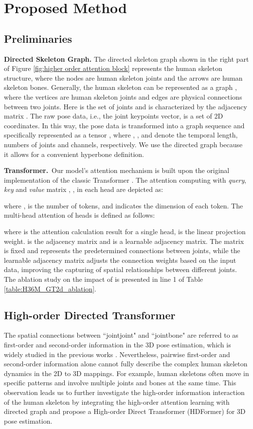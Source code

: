 \documentclass{article}
\begin{document}
\section{Proposed Method}
\subsection{Preliminaries}
\noindent \textbf{Directed Skeleton Graph.} The directed skeleton graph  shown in the right part of Figure \ref{fig:higher order attention block} represents the human skeleton structure, where the nodes are human skeleton joints and the arrows are human skeleton bones. Generally, the human skeleton can be represented as a graph , where the vertices are human skeleton joints and edges are physical connections between two joints. Here  is the set of  joints and  is characterized by the adjacency matrix . 
The raw pose data, i.e., the joint keypoints vector, is a set of 2D coordinates. In this way, the pose data is transformed into a graph sequence and specifically represented as a tensor , where , , and  denote the temporal length, numbers of joints and channels, respectively. We use the directed graph because it allows for a convenient hyperbone definition.


\noindent \textbf{Transformer.}~Our model's attention mechanism is built upon the original implementation of the classic Transformer \cite{vaswani2017attention}. The attention computing with \textit{query}, \textit{key} and \textit{value} matrix , ,  in each head are depicted as:

where ,  is the number of tokens, and  indicates the dimension of each token. The multi-head attention of  heads is defined as follows:


where  is the attention calculation result for a single head,  is the linear projection weight.  is the adjacency matrix and  is a learnable adjacency matrix. The matrix  is fixed and represents the predetermined connections between joints, while the learnable adjacency matrix  adjusts the connection weights based on the input data, improving the capturing of spatial relationships between different joints. The ablation study on the impact of  is presented in line 1 of Table \ref{table:H36M_GT2d_ablation}.

\subsection{High-order Directed Transformer}
\label{sec:High-order Directed Transformer}
The spatial connections between ``jointjoint" and ``jointbone" are referred to as first-order and second-order information in the 3D pose estimation, which is widely studied in the previous works \cite{ZhangCVPR22MixSTE}. Nevertheless, pairwise first-order and second-order information alone cannot fully describe the complex human skeleton dynamics in the 2D to 3D mappings. For example, human skeletons often move in specific patterns and involve multiple joints and bones at the same time. This observation leads us to further investigate the high-order information interaction of the human skeleton by integrating the high-order attention learning with directed graph and propose a High-order Direct Transformer (HDFormer) for 3D pose estimation.
\end{document}
